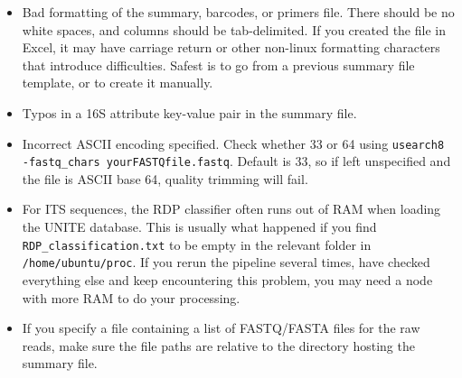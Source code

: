 \documentclass[11pt, oneside]{article}   	%
\begin{document}
\begin{itemize}
\item Bad formatting of the summary, barcodes, or primers file.  There should be no white spaces, and columns should be tab-delimited.  If you created the file in Excel, it may have carriage return or other non-linux formatting characters that introduce difficulties.  Safest is to go from a previous summary file template, or to create it manually.
\item Typos in a 16S attribute key-value pair in the summary file.
\item Incorrect ASCII encoding specified.  Check whether 33 or 64 using {\tt usearch8 -fastq\_chars yourFASTQfile.fastq}.  Default is 33, so if left unspecified and the file is ASCII base 64, quality trimming will fail.
\item For ITS sequences, the RDP classifier often runs out of RAM when loading the UNITE database.  This is usually what happened if you find {\tt RDP\_classification.txt} to be empty in the relevant folder in {\tt /home/ubuntu/proc}.  If you rerun the pipeline several times, have checked everything else and keep encountering this problem, you may need a node with more RAM to do your processing.
\item If you specify a file containing a list of FASTQ/FASTA files for the raw reads, make sure the file paths are relative to the directory hosting the summary file.
\end{itemize}
\end{document}
